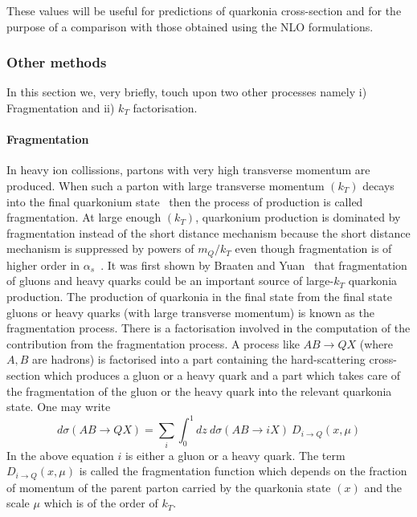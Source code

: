 These values will be useful for predictions
of quarkonia cross-section and for the purpose of a comparison with those obtained using the NLO formulations.


\subsubsection{Other methods}

 In this section we, very briefly, touch upon two other processes namely i) Fragmentation and ii) $k_T$ factorisation. 

\paragraph{Fragmentation}

In heavy ion collissions, partons with very high transverse momentum are produced. When 
such a parton  with large
transverse momentum $(k_T)$ decays into the final
quarkonium state~\cite{frag} then the process of production is called fragmentation. At large enough $(k_T)$, 
quarkonium production is dominated by
fragmentation instead of the short distance mechanism because the short distance
mechanism is suppressed by powers of $m_Q/k_T$ even though fragmentation is of higher
order in $\alpha_s$~\cite{frag}. 
 It was first shown by Braaten and Yuan~\cite{frag,frag1} that fragmentation of gluons and heavy quarks
could be an important source of large-$k_T$ quarkonia production. The production of quarkonia in the 
 final state from the final state gluons or heavy quarks (with large transverse momentum)  is known as 
 the fragmentation process. There is a factorisation involved in the computation of the contribution 
 from the fragmentation process. A process like $A  B \rightarrow Q  X$ (where $A,B$ are  hadrons)
is factorised  into a part containing the hard-scattering cross-section which produces a gluon or a heavy quark 
and a part which takes care of the fragmentation of the gluon or the heavy quark into the
relevant quarkonia state. One may write 
\begin{equation}
d\sigma (A  B \rightarrow Q X) = \sum_i \int_0^1 dz \ d\sigma  (A  B \rightarrow i  X) \ D_{i \rightarrow Q} (x,\mu)
\end{equation}
In the above equation $i$ is either a gluon or a heavy quark. The term $D_{i \rightarrow Q} (x,\mu)$ 
is called the fragmentation function which depends on the fraction of momentum of the parent parton 
carried by the quarkonia state $(x)$ and the scale $\mu$ which is of the order of $k_T$. 

